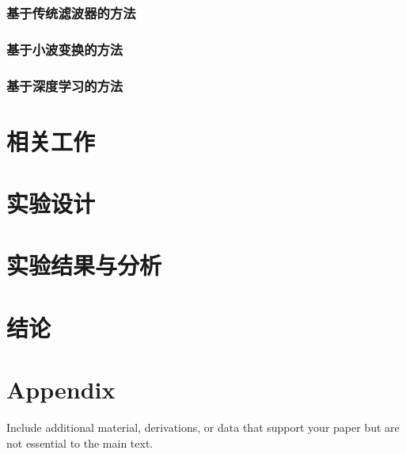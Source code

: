 \documentclass[12pt]{article}
\begin{document}
\subsubsection{基于传统滤波器的方法}
\subsubsection{基于小波变换的方法}
\subsubsection{基于深度学习的方法}

\section{相关工作}

\section{实验设计}

\section{实验结果与分析}

\section{结论}




\appendix
\section{Appendix}
Include additional material, derivations, or data that support your paper but are not essential to the main text.
\end{document}
